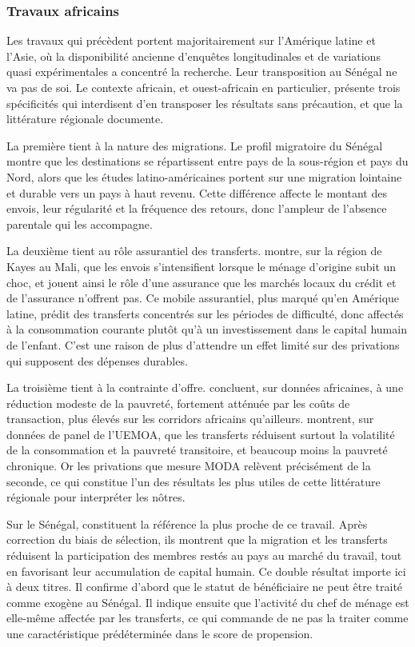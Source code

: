\subsubsection{Travaux africains}

Les travaux qui précèdent portent majoritairement sur l'Amérique latine
et l'Asie, où la disponibilité ancienne d'enquêtes longitudinales et de
variations quasi expérimentales a concentré la recherche. Leur
transposition au Sénégal ne va pas de soi. Le contexte africain, et ouest-africain en particulier, présente trois
spécificités qui interdisent d'en transposer les résultats sans précaution, et
que la littérature régionale documente.

La première tient à la nature des migrations. Le profil migratoire du Sénégal
\parencite{ansd2018profil} montre que les destinations se répartissent entre
pays de la sous-région et pays du Nord, alors que les études latino-américaines
portent sur une migration lointaine et durable vers un pays à haut revenu. Cette différence affecte le montant des envois, leur régularité
et la fréquence des retours, donc l'ampleur de l'absence parentale qui les
accompagne.

La deuxième tient au rôle assurantiel des transferts. \textcite{gubert2002}
montre, sur la région de Kayes au Mali, que les envois s'intensifient lorsque le
ménage d'origine subit un choc, et jouent ainsi le rôle d'une assurance que les
marchés locaux du crédit et de l'assurance n'offrent pas. Ce mobile assurantiel,
plus marqué qu'en Amérique latine, prédit des transferts concentrés sur les
périodes de difficulté, donc affectés à la consommation courante plutôt qu'à un
investissement dans le capital humain de l'enfant. C'est une raison de plus
d'attendre un effet limité sur des privations qui supposent des dépenses
durables.

La troisième tient à la contrainte d'offre. \textcite{azam2006} concluent, sur
données africaines, à une réduction modeste de la pauvreté, fortement atténuée
par les coûts de transaction, plus élevés sur les corridors africains
qu'ailleurs. \textcite{combes2011} montrent, sur données de panel de l'UEMOA,
que les transferts réduisent surtout la volatilité de la consommation et la
pauvreté transitoire, et beaucoup moins la pauvreté chronique. Or les
privations que mesure MODA relèvent précisément de la seconde, ce qui constitue
l'un des résultats les plus utiles de cette littérature régionale pour
interpréter les nôtres.

Sur le Sénégal, \textcite{ndiaye2016} constituent la référence la plus proche de
ce travail. Après correction du biais de sélection, ils montrent que la
migration et les transferts réduisent la participation des membres restés au
pays au marché du travail, tout en favorisant leur accumulation de capital
humain. Ce double résultat importe ici à deux titres. Il confirme d'abord que le
statut de bénéficiaire ne peut être traité comme exogène au Sénégal. Il indique
ensuite que l'activité du chef de ménage est elle-même affectée par les
transferts, ce qui commande de ne pas la traiter comme une caractéristique
prédéterminée dans le score de propension.


